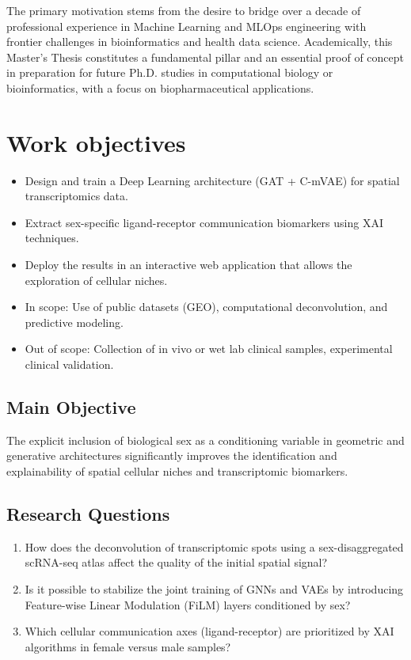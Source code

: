 \documentclass[ENG,BIB]{TFUOC}%
\begin{document}
The primary motivation stems from the desire to bridge over a decade of professional experience in Machine Learning and MLOps engineering with frontier challenges in bioinformatics and health data science. Academically, this Master's Thesis constitutes a fundamental pillar and an essential proof of concept in preparation for future Ph.D. studies in computational biology or bioinformatics, with a focus on biopharmaceutical applications.


\section{Work objectives}

\begin{itemize}
\item Design and train a Deep Learning architecture (GAT + C-mVAE) for spatial transcriptomics data.
\item Extract sex-specific ligand-receptor communication biomarkers using XAI techniques.
\item Deploy the results in an interactive web application that allows the exploration of cellular niches.
\item In scope: Use of public datasets (GEO), computational deconvolution, and predictive modeling.
\item Out of scope: Collection of in vivo or wet lab clinical samples, experimental clinical validation.
\end{itemize}


\subsection{Main Objective}

The explicit inclusion of biological sex as a conditioning variable in geometric and generative architectures significantly improves the identification and explainability of spatial cellular niches and transcriptomic biomarkers.

\subsection{Research Questions} 

\begin{enumerate}
\item How does the deconvolution of transcriptomic spots using a sex-disaggregated scRNA-seq atlas affect the quality of the initial spatial signal?
\item Is it possible to stabilize the joint training of GNNs and VAEs by introducing Feature-wise Linear Modulation (FiLM) layers conditioned by sex?
\item Which cellular communication axes (ligand-receptor) are prioritized by XAI algorithms in female versus male samples?
\end{enumerate}
\end{document}
